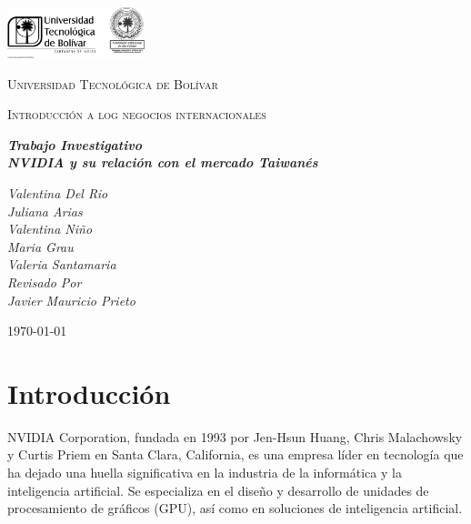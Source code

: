\documentclass[letterpaper, 12pt]{article}
\begin{document}
\begin{titlepage}
      \centering
      \includegraphics[width=0.3\textwidth]{Images/logo_utb.png}\par\vspace{1cm}
      {\scshape\LARGE Universidad Tecnológica de Bolívar \par}
      \vspace{.5cm}

      {\scshape\Large Introducción a log negocios internacionales \par}
      \vspace{.2cm}

      \slshape {\Large \bfseries{}Trabajo Investigativo\\}
      \slshape {\small \bfseries{}NVIDIA y su relación con el mercado Taiwanés}
      \vspace{1cm}

      \slshape {\itshape{} Valentina Del Rio \\}
      \slshape {\itshape{} Juliana Arias \\}
      \slshape {\itshape{} Valentina Niño \\}
      \slshape {\itshape{} Maria Grau \\}
      \slshape {\itshape{} Valeria Santamaria \\}
      \vfill
      Revisado Por \\
      Javier Mauricio Prieto \\
      {\large \today\par}
\end{titlepage}


\nocite{*}

\section{Introducción}

NVIDIA Corporation, fundada en 1993 por Jen-Hsun Huang, Chris
Malachowsky y Curtis Priem en Santa Clara, California, es una
empresa líder en tecnología que ha dejado una huella
significativa en la industria de la informática y la
inteligencia artificial. Se especializa en el diseño y
desarrollo de unidades de procesamiento de gráficos (GPU),
así como en soluciones de inteligencia artificial.
\end{document}
